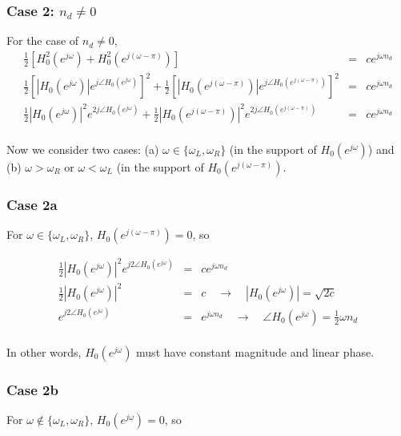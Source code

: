 \documentclass[11pt]{article}
\begin{document}
\subsubsection*{Case 2: $n_d \neq 0$}

For the case of $n_d \neq 0$, 
\begin{eqnarray*}
\frac{1}{2}\left[ H_0^2(e^{j\omega})+H_0^2(e^{j(\omega-\pi)}) \right] &=& c e^{j \omega n_d} \\
\frac{1}{2}\left[|H_0(e^{j\omega})|e^{j\angle H_0(e^{j\omega})} \right]^2 + \frac{1}{2}\left[|H_0(e^{j(\omega-\pi)})|e^{j\angle H_0(e^{j(\omega - \pi)})} \right]^2 &=& c e^{j \omega n_d} \\
\frac{1}{2}|H_0(e^{j\omega})|^2 e^{2j\angle H_0(e^{j\omega})} + \frac{1}{2}|H_0(e^{j(\omega-\pi)})|^2 e^{2j\angle H_0(e^{j(\omega - \pi)})}  &=& c e^{j \omega n_d} \\
\end{eqnarray*}

Now we consider two cases: (a) $\omega \in \{\omega_L, \omega_R\}$ (in the support of $H_0(e^{j\omega})$) and (b) $\omega > \omega_R$ or $\omega < \omega_L$ (in the support of $H_0(e^{j(\omega-\pi)})$.

\subsubsection*{Case 2a}

For $\omega \in \{\omega_L, \omega_R\}$, $H_0(e^{j(\omega-\pi)})= 0$, so 

\begin{eqnarray*}
\frac{1}{2}|H_0(e^{j\omega})|^2 e^{j2\angle H_0(e^{j\omega})}  &=& c e^{j \omega n_d} \\
\frac{1}{2}|H_0(e^{j\omega})|^2 &=& c \quad \rightarrow \quad |H_0(e^{j\omega})| = \sqrt{2c}\\
e^{j2\angle H_0(e^{j\omega})}  &=& e^{j \omega n_d} \quad \rightarrow \quad \angle H_0(e^{j\omega}) = \frac{1}{2} \omega n_d \\
\end{eqnarray*}

In other words, $H_0(e^{j\omega})$ must have constant magnitude and linear phase.

\subsubsection*{Case 2b}

For $\omega \not\in \{\omega_L, \omega_R\}$, $H_0(e^{j\omega})= 0$, so 
\end{document}
